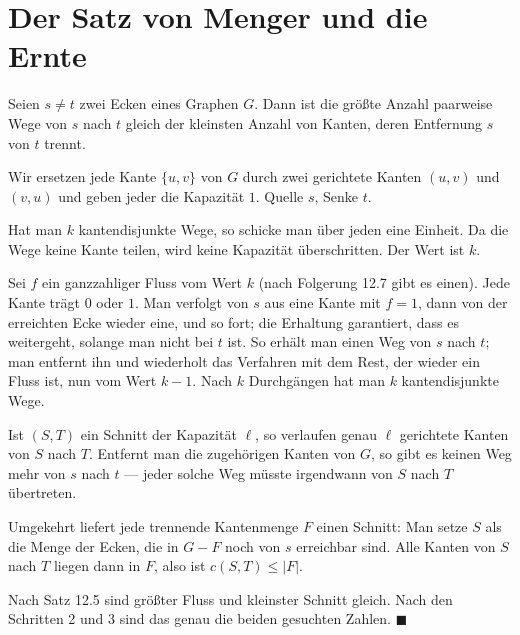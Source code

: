 \section{Der Satz von Menger und die Ernte}

\begin{merksatz}
Seien $s \neq t$ zwei Ecken eines Graphen $G$. Dann ist die größte Anzahl paarweise  Wege von $s$ nach $t$ gleich der kleinsten Anzahl von Kanten, deren Entfernung $s$ von $t$ trennt.
\end{merksatz}

\begin{merksatz}
Wir ersetzen jede Kante $\{u,v\}$ von $G$ durch zwei gerichtete Kanten $(u,v)$ und $(v,u)$ und geben jeder die Kapazität $1$. Quelle $s$, Senke $t$.

 Hat man $k$ kantendisjunkte Wege, so schicke man über jeden eine Einheit. Da die Wege keine Kante teilen, wird keine Kapazität überschritten. Der Wert ist $k$.

 Sei $f$ ein ganzzahliger Fluss vom Wert $k$ (nach Folgerung 12.7 gibt es einen). Jede Kante trägt $0$ oder $1$. Man verfolgt von $s$ aus eine Kante mit $f = 1$, dann von der erreichten Ecke wieder eine, und so fort; die Erhaltung garantiert, dass es weitergeht, solange man nicht bei $t$ ist. So erhält man einen Weg von $s$ nach $t$; man entfernt ihn und wiederholt das Verfahren mit dem Rest, der wieder ein Fluss ist, nun vom Wert $k-1$. Nach $k$ Durchgängen hat man $k$ kantendisjunkte Wege.

Ist $(S,T)$ ein Schnitt der Kapazität $\ell$, so verlaufen genau $\ell$ gerichtete Kanten von $S$ nach $T$. Entfernt man die zugehörigen Kanten von $G$, so gibt es keinen Weg mehr von $s$ nach $t$ --- jeder solche Weg müsste irgendwann von $S$ nach $T$ übertreten.

Umgekehrt liefert jede trennende Kantenmenge $F$ einen Schnitt: Man setze $S$ als die Menge der Ecken, die in $G - F$ noch von $s$ erreichbar sind. Alle Kanten von $S$ nach $T$ liegen dann in $F$, also ist $c(S,T) \le |F|$.

Nach Satz 12.5 sind größter Fluss und kleinster Schnitt gleich. Nach den Schritten 2 und 3 sind das genau die beiden gesuchten Zahlen. $\blacksquare$
\end{merksatz}

